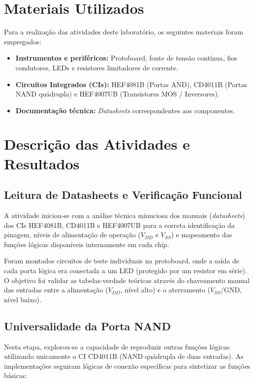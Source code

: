 \documentclass[conference]{IEEEtran}
\begin{document}
\section{Materiais Utilizados}
Para a realização das atividades deste laboratório, os seguintes materiais foram empregados:
\begin{itemize}
    \item \textbf{Instrumentos e periféricos:} Protoboard, fonte de tensão contínua, fios condutores, LEDs e resistores limitadores de corrente.
    \item \textbf{Circuitos Integrados (CIs):} HEF4081B (Portas AND), CD4011B (Portas NAND quádrupla) e HEF4007UB (Transistores MOS / Inversores).
    \item \textbf{Documentação técnica:} \textit{Datasheets} correspondentes aos componentes.
\end{itemize}

\section{Descrição das Atividades e Resultados}

\subsection{Leitura de Datasheets e Verificação Funcional}
A atividade iniciou-se com a análise técnica minuciosa dos manuais (\textit{datasheets}) dos CIs HEF4081B, CD4011B e HEF4007UB para a correta identificação da pinagem, níveis de alimentação de operação ($V_{DD}$ e $V_{SS}$) e mapeamento das funções lógicas disponíveis internamente em cada chip.

Foram montados circuitos de teste individuais na protoboard, onde a saída de cada porta lógica era conectada a um LED (protegido por um resistor em série). O objetivo foi validar as tabelas-verdade teóricas através do chaveamento manual das entradas entre a alimentação ($V_{DD}$, nível alto) e o aterramento ($V_{SS}$/GND, nível baixo).

\subsection{Universalidade da Porta NAND}
Nesta etapa, explorou-se a capacidade de reproduzir outras funções lógicas utilizando unicamente o CI CD4011B (NAND quádrupla de duas entradas). As implementações seguiram lógicas de conexão específicas para sintetizar as funções básicas:
\end{document}
